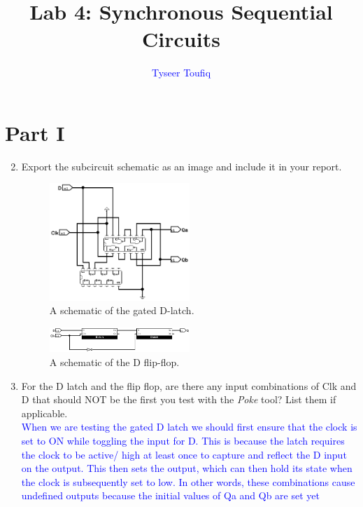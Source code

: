 \documentclass{article}
\title{Lab 4: Synchronous Sequential Circuits}
\author{\textcolor{blue}{Tyseer Toufiq}}
\begin{document}
\maketitle

\section*{Part I}

\begin{enumerate}
\setcounter{enumi}{1}
\item Export the subcircuit schematic as an image and include it in your report.

\begin{figure}[ht!]
    \centering
    \includegraphics[width=0.5\textwidth]{D-latch.png}
    \caption{A schematic of the gated D-latch.}
    \label{gateddlatch}
\end{figure}


\begin{figure}[ht!]
    \centering
    \includegraphics[width=0.5\textwidth]{flip-flop.png}
    \caption{A schematic of the D flip-flop.}
    \label{dflipdlop}
\end{figure}


\item For the D latch and the flip flop, are there any input combinations of Clk and D that should NOT be the first you test with the \emph{Poke} tool? List them if applicable. 
\textcolor{blue}{ 
\\
When we are testing the gated D latch we should first ensure that the clock is set to ON while toggling the input for D. This is because the latch requires the clock to be active/ high at least once to capture and reflect the D input on the output. This then sets the output, which can then hold its state when the clock is subsequently set to low. In other words, these combinations cause undefined outputs because the initial values of Qa and Qb are set yet}
\end{enumerate}
\end{document}
